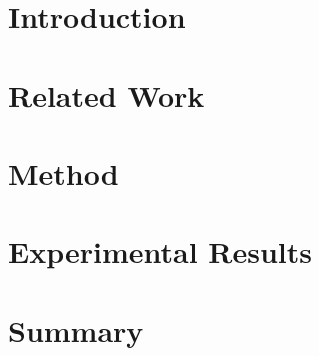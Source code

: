 \documentclass{vldb}
\begin{document}


\section{Introduction} \label{sec:intro}




% 

\section{Related Work} \label{sec:relatedWork}



\section{Method} \label{sec:method}



\section{Experimental Results} \label{sec:results}



\section{Summary} \label{sec:conclusion}
\end{document}
